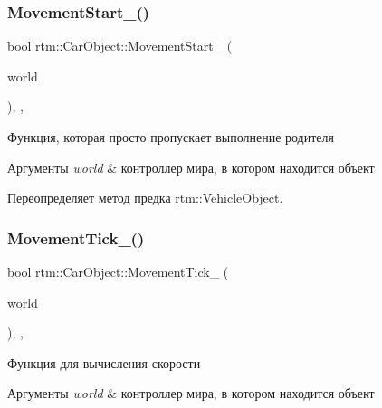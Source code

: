 \subsubsection{\texorpdfstring{Movement\+Start\+\_\+()}{MovementStart\_()}}
{\footnotesize\ttfamily bool rtm\+::\+Car\+Object\+::\+Movement\+Start\+\_\+ (\begin{DoxyParamCaption}\item[{\hyperlink{classrtm_1_1_world_controller}{World\+Controller} $\ast$const}]{world }\end{DoxyParamCaption})\hspace{0.3cm}{\ttfamily [override]}, {\ttfamily [protected]}, {\ttfamily [virtual]}}

Функция, которая просто пропускает выполнение родителя 
\begin{DoxyParams}{Аргументы}
{\em world} & контроллер мира, в котором находится объект \\
\hline
\end{DoxyParams}


Переопределяет метод предка \hyperlink{classrtm_1_1_vehicle_object_aa02e0b8f3fa159939f370938e45abf88}{rtm\+::\+Vehicle\+Object}.

\mbox{\label{classrtm_1_1_car_object_abe89fea4893e244d9f6fb17c596b5ae0}} 
\subsubsection{\texorpdfstring{Movement\+Tick\+\_\+()}{MovementTick\_()}}
{\footnotesize\ttfamily bool rtm\+::\+Car\+Object\+::\+Movement\+Tick\+\_\+ (\begin{DoxyParamCaption}\item[{\hyperlink{classrtm_1_1_world_controller}{World\+Controller} $\ast$const}]{world }\end{DoxyParamCaption})\hspace{0.3cm}{\ttfamily [override]}, {\ttfamily [protected]}, {\ttfamily [virtual]}}

Функция для вычисления скорости 
\begin{DoxyParams}{Аргументы}
{\em world} & контроллер мира, в котором находится объект \\
\hline
\end{DoxyParams}


